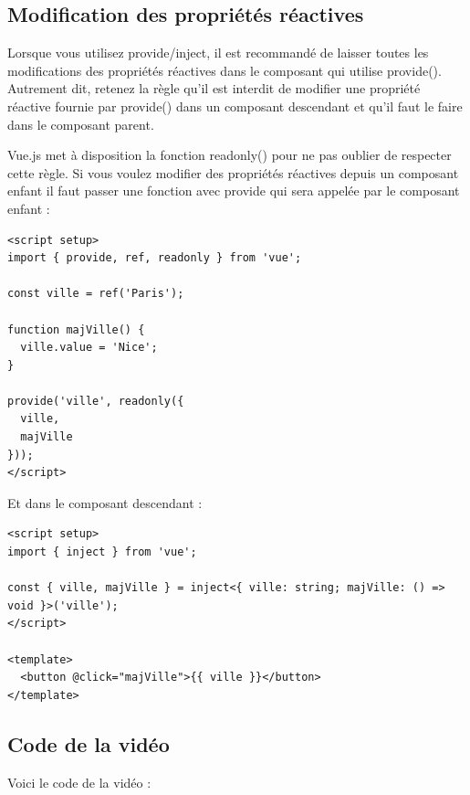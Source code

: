 \subsection{Modification des propriétés réactives}
Lorsque vous utilisez {\color{monOrange}provide/inject}, il est recommandé de laisser toutes les modifications des propriétés réactives dans le composant qui utilise {\color{monOrange}provide()}. Autrement dit, retenez la règle qu'il est interdit de modifier une propriété réactive fournie par {\color{monOrange}provide()} dans un composant descendant et qu'il faut le faire dans le composant parent.

{\color{monOrange}Vue.js} met à disposition la fonction {\color{monOrange}readonly()} pour ne pas oublier de respecter cette règle. Si vous voulez modifier des propriétés réactives depuis un composant enfant il faut passer une fonction avec {\color{monOrange}provide} qui sera appelée par le composant enfant :
\begin{verbatim}
<script setup>
import { provide, ref, readonly } from 'vue';

const ville = ref('Paris');

function majVille() {
  ville.value = 'Nice';
}

provide('ville', readonly({
  ville,
  majVille
}));
</script>
\end{verbatim}
Et dans le composant descendant :
\begin{verbatim}
<script setup>
import { inject } from 'vue';

const { ville, majVille } = inject<{ ville: string; majVille: () => void }>('ville');
</script>

<template>
  <button @click="majVille">{{ ville }}</button>
</template>
\end{verbatim}
\subsection{Code de la vidéo}
Voici le code de la vidéo :
